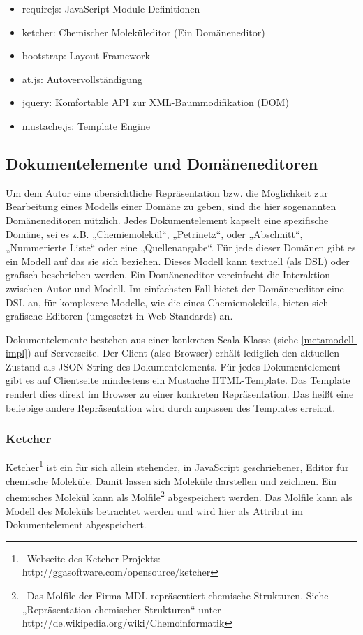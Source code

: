  
\begin{itemize}

\item requirejs: JavaScript Module Definitionen
\item ketcher: Chemischer Moleküleditor (Ein Domäneneditor)
\item bootstrap: Layout Framework
\item at.js: Autovervollständigung
\item jquery: Komfortable API zur XML-Baummodifikation (DOM)
\item mustache.js: Template Engine
\end{itemize}
 
\subsection{Dokumentelemente und Domäneneditoren}\label{}
 
Um dem Autor eine übersichtliche Repräsentation bzw. die Möglichkeit zur Bearbeitung eines Modells einer Domäne zu geben, sind die hier sogenannten Domäneneditoren nützlich. Jedes Dokumentelement kapselt eine spezifische Domäne, sei es z.B. „Chemiemolekül“, „Petrinetz“, oder „Abschnitt“, „Nummerierte Liste“ oder eine „Quellenangabe“. Für jede dieser Domänen gibt es ein Modell auf das sie sich beziehen. Dieses Modell kann textuell (als DSL) oder grafisch beschrieben werden. Ein Domäneneditor vereinfacht die Interaktion zwischen Autor und Modell. Im einfachsten Fall bietet der Domäneneditor eine DSL an, für komplexere Modelle, wie die eines Chemiemoleküls, bieten sich grafische Editoren (umgesetzt in Web Standards) an.

 
Dokumentelemente bestehen aus einer konkreten Scala Klasse (siehe \ref{metamodell-impl}) auf Serverseite. Der Client (also Browser) erhält lediglich den aktuellen Zustand als JSON-String des Dokumentelements. Für jedes Dokumentelement gibt es auf Clientseite mindestens ein Mustache HTML-Template. Das Template rendert dies direkt im Browser zu einer konkreten Repräsentation. Das heißt eine beliebige andere Repräsentation wird durch anpassen des Templates erreicht.

 
\subsubsection{Ketcher}\label{}

 
Ketcher\footnote{~Webseite des Ketcher Projekts: http://ggasoftware.com/opensource/ketcher} ist ein für sich allein stehender, in JavaScript geschriebener, Editor für chemische Moleküle. Damit lassen sich Moleküle darstellen und zeichnen. Ein chemisches Molekül kann als Molfile\footnote{~Das Molfile der Firma MDL repräsentiert chemische Strukturen. Siehe „Repräsentation chemischer Strukturen“ unter http://de.wikipedia.org/wiki/Chemoinformatik } abgespeichert werden. Das Molfile kann als Modell des Moleküls betrachtet werden und wird hier als Attribut im Dokumentelement abgespeichert.


